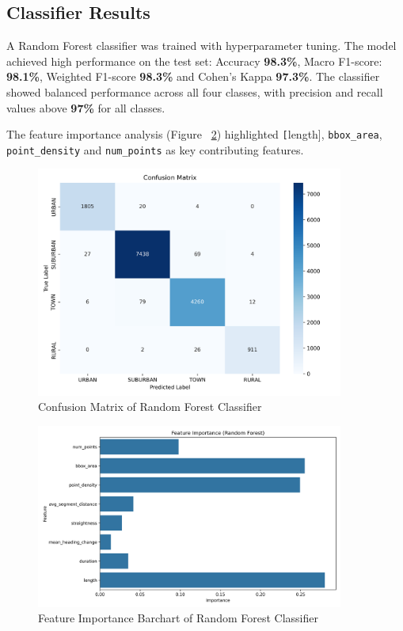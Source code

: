 \documentclass[a4paper,12pt,twoside]{scrreprt}
\begin{document}
\subsection{Classifier Results}

A Random Forest classifier was trained with hyperparameter tuning.
The model achieved high performance on the test set: Accuracy \textbf{98.3\%},
Macro F1-score: \textbf{98.1\%}, Weighted F1-score \textbf{98.3\%} and Cohen's
Kappa \textbf{97.3\%}.
The classifier showed balanced performance across all four classes, with
precision and recall values above \textbf{97\%} for all classes.

The feature importance analysis (Figure
~\ref{fig:feature_importance_random_forest})
highlighted \texttt[length], \texttt{bbox\_area}, \texttt{point\_density} and
\texttt{num\_points} as key contributing features.

\begin{figure}[htbp]
  \centering

  \includegraphics[width=0.9\textwidth]{Figures/classifier/confusion_matric_label_prediction.png}
  \caption{Confusion Matrix of Random Forest Classifier}
  \label{fig:confusion_matrix_random_forest}
\end{figure}

\begin{figure}[htbp]
  \centering

  \includegraphics[width=0.9\textwidth]{Figures/classifier/feature_importance_random_forest.png}
  \caption{Feature Importance Barchart of Random Forest Classifier}
  \label{fig:feature_importance_random_forest}
\end{figure}
\end{document}
